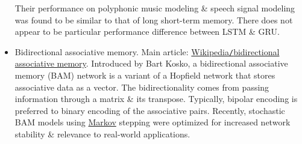 \documentclass{article}
\begin{document}
\begin{itemize}
	Their performance on polyphonic music modeling \& speech signal modeling was found to be similar to that of long short-term memory. There does not appear to be particular performance difference between LSTM \& GRU.
	\item {\sf Bidirectional associative memory.} Main article: \href{https://en.wikipedia.org/wiki/Bidirectional_associative_memory}{Wikipedia{\tt/}bidirectional associative memory}. Introduced by {\sc Bart Kosko}, a bidirectional associative memory (BAM) network is a variant of a Hopfield network that stores associative data as a vector. The bidirectionality comes from passing information through a matrix \& its transpose. Typically, bipolar encoding is preferred to binary encoding of the associative pairs. Recently, stochastic BAM models using \href{https://en.wikipedia.org/wiki/Markov_chain}{Markov} stepping were optimized for increased network stability \& relevance to real-world applications.
	

\end{itemize}
\end{document}
